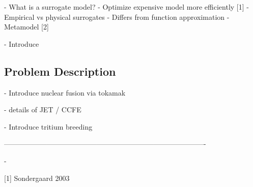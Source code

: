 - What is a surrogate model?
    - Optimize expensive model more efficiently [1]
    - Empirical vs physical surrogates
    - Differs from function approximation
    - Metamodel [2] 

- Introduce 


\subsection{Problem Description}
\label{sec:problemdescription}

- Introduce nuclear fusion via tokamak

- details of JET / CCFE

- Introduce tritium breeding

-------------------------------------------------------------------------------------

-













[1] Sondergaard 2003

